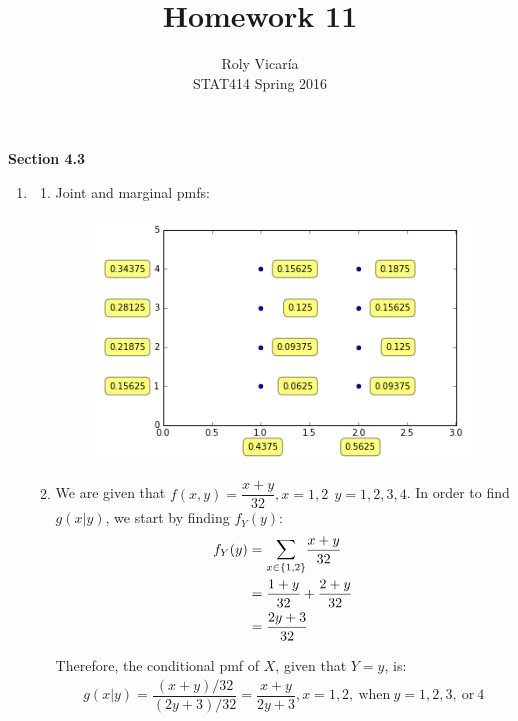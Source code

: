 \documentclass{article}
\title{Homework 11}
\author{Roly Vicar\'ia \\ STAT414 Spring 2016}
\begin{document}
    
    \maketitle
    
    \textbf{Section 4.3}
    \begin{enumerate}
     \item 
      \begin{enumerate}
       \item
	Joint and marginal pmfs:
	\begin{figure}[h!]
	  \centering
	  \includegraphics[scale=.6,keepaspectratio=true]{./images/1a_joint_probability_plot.png}
	\end{figure}
       
       \newpage
       \item
	We are given that $f(x,y) = \dfrac{x+y}{32}, x=1,2\ \ y=1,2,3,4$. In order to find $g(x|y)$,
	we start by finding $f_Y(y)$:
	  \begin{align*}
	   f_Y(y) &= \mathlarger{\sum}_{x\in\{1,2\}}{\dfrac{x+y}{32}} \\
	    &= \dfrac{1+y}{32} + \dfrac{2+y}{32} \\
	    &= \dfrac{2y + 3}{32}
	  \end{align*}

	Therefore, the conditional pmf of $X$, given that $Y = y$, is:
	  \begin{align*}
	   g(x|y) = \dfrac{(x+y)/32}{(2y+3)/32} = \dfrac{x+y}{2y+3}, 
		x=1,2,\ \text{when}\ y=1,2,3,\ \text{or}\ 4
	  \end{align*}
	  

\end{enumerate}
\end{enumerate}
\end{document}
